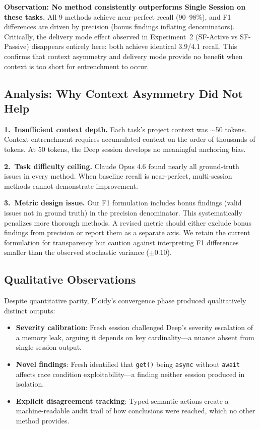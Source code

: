 \documentclass[11pt]{article}
\begin{document}
\textbf{Observation: No method consistently outperforms Single Session on these tasks.} All 9 methods achieve near-perfect recall (90--98\%), and F1 differences are driven by precision (bonus findings inflating denominators). Critically, the delivery mode effect observed in Experiment~2 (SF-Active vs SF-Passive) disappears entirely here: both achieve identical 3.9/4.1 recall. This confirms that context asymmetry and delivery mode provide no benefit when context is too short for entrenchment to occur.

\subsection{Analysis: Why Context Asymmetry Did Not Help}
\label{sec:why-no-help}

\textbf{1.\ Insufficient context depth.} Each task's project context was $\sim$50 tokens. Context entrenchment requires accumulated context on the order of thousands of tokens. At 50 tokens, the Deep session develops no meaningful anchoring bias.

\textbf{2.\ Task difficulty ceiling.} Claude Opus 4.6 found nearly all ground-truth issues in every method. When baseline recall is near-perfect, multi-session methods cannot demonstrate improvement.

\textbf{3.\ Metric design issue.} Our F1 formulation includes bonus findings (valid issues not in ground truth) in the precision denominator. This systematically penalizes more thorough methods. A revised metric should either exclude bonus findings from precision or report them as a separate axis. We retain the current formulation for transparency but caution against interpreting F1 differences smaller than the observed stochastic variance ($\pm 0.10$).

\subsection{Qualitative Observations}
\label{sec:qualitative}

Despite quantitative parity, Ploidy's convergence phase produced qualitatively distinct outputs:

\begin{itemize}[leftmargin=1.5em]
  \item \textbf{Severity calibration}: Fresh session challenged Deep's severity escalation of a memory leak, arguing it depends on key cardinality---a nuance absent from single-session output.
  \item \textbf{Novel findings}: Fresh identified that \texttt{get()} being \texttt{async} without \texttt{await} affects race condition exploitability---a finding neither session produced in isolation.
  \item \textbf{Explicit disagreement tracking}: Typed semantic actions create a machine-readable audit trail of how conclusions were reached, which no other method provides.
\end{itemize}
\end{document}
